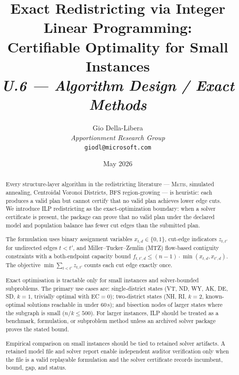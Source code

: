 \documentclass[12pt]{article}
\title{%
  \textbf{Exact Redistricting via Integer Linear Programming:}\\
  \textbf{Certifiable Optimality for Small Instances}\\[0.8em]
  \normalsize\textit{U.6 --- Algorithm Design / Exact Methods}%
}
\author{%
  Gio Della-Libera\\
  \textit{Apportionment Research Group}\\
  \small\texttt{giodl@microsoft.com}
}
\date{May 2026}
\newcommand{\ilp}{\textsc{ILP}}
\newcommand{\metis}{\textsc{Metis}}
\begin{document}
\maketitle

\begin{abstract}
\noindent
Every structure-layer algorithm in the redistricting literature --- \metis{},
simulated annealing, Centroidal Voronoi Districts, BFS region-growing --- is
heuristic: each produces a valid plan but cannot certify that no valid plan
achieves lower edge cuts.
We introduce \ilp{} redistricting as the exact-optimization boundary: when a
solver certificate is present, the package can prove that no valid plan under
the declared model and population balance has fewer cut edges than the submitted
plan.

The formulation uses binary assignment variables $x_{t,d} \in \{0,1\}$,
cut-edge indicators $z_{t,t'}$ for undirected edges $t < t'$, and
Miller--Tucker--Zemlin (MTZ) flow-based contiguity constraints with a
both-endpoint capacity bound $f_{t,t',d} \leq (n-1)\cdot\min(x_{t,d},
x_{t',d})$.
The objective $\min\sum_{t<t'} z_{t,t'}$ counts each cut edge exactly once.

Exact optimisation is tractable only for small instances and solver-bounded
subproblems.
The primary use cases are: single-district states (VT, ND, WY, AK, DE, SD,
$k=1$, trivially optimal with EC$= 0$); two-district states (NH, RI, $k=2$,
known-optimal solutions reachable in under 60\,s); and bisection nodes of
larger states where the subgraph is small ($n/k \leq 500$).
For larger instances, ILP should be treated as a benchmark, formulation, or
subproblem method unless an archived solver package proves the stated bound.

Empirical comparison on small instances should be tied to retained solver
artifacts.  A retained model file and solver report enable independent auditor
verification only when the file is a valid replayable formulation and the solver
certificate records incumbent, bound, gap, and status.
\end{abstract}

\tableofcontents
\newpage











\end{document}
